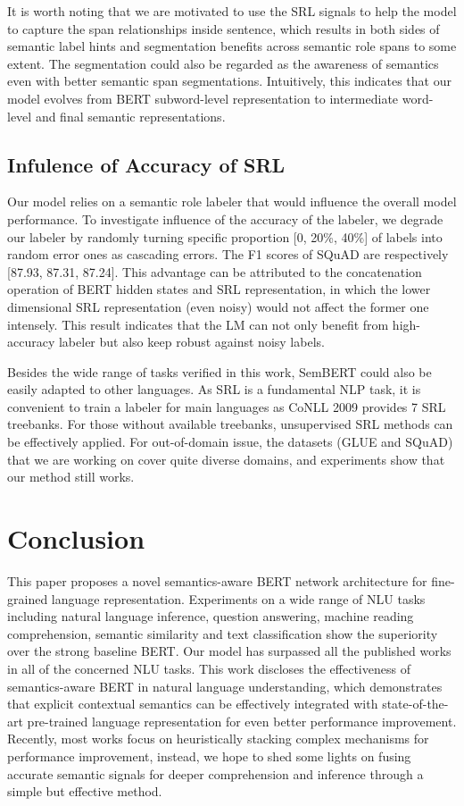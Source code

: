 \documentclass[letterpaper]{article} \usepackage{aaai20}  \usepackage{times}  \usepackage{helvet} \usepackage{courier}  \usepackage[hyphens]{url}  \usepackage{graphicx} \urlstyle{rm} \def\UrlFont{\rm}  \usepackage{graphicx}  \frenchspacing  \usepackage{amssymb}
\begin{document}
It is worth noting that we are motivated to use the SRL signals to help the model to capture the span relationships inside sentence, which results in both sides of semantic label hints and segmentation benefits across semantic role spans to some extent. The segmentation could also be regarded as the awareness of semantics even with better semantic span segmentations. Intuitively, this indicates that our model evolves from BERT subword-level representation to intermediate word-level and final semantic representations.

\subsection{Infulence of Accuracy of SRL}
Our model relies on a semantic role labeler that would influence the overall model performance. To investigate influence of the accuracy of the labeler, we degrade our labeler by randomly turning specific proportion [0, 20\%, 40\%] of labels into random error ones as cascading errors. The F1 scores of SQuAD are respectively [87.93, 87.31, 87.24]. This advantage can be attributed to the concatenation operation of BERT hidden states and SRL representation, in which the lower dimensional SRL representation (even noisy)  would not affect the former one intensely. This result indicates that the LM can not only benefit from high-accuracy labeler but also keep robust against noisy labels.

Besides the wide range of tasks verified in this work, SemBERT could also be easily adapted to other languages. As SRL is a fundamental NLP task, it is convenient to train a labeler for main languages as CoNLL 2009 provides 7 SRL treebanks. For those without available treebanks, unsupervised SRL methods can be effectively applied. For out-of-domain issue, the datasets (GLUE and SQuAD) that we are working on cover quite diverse domains, and experiments show that our method still works.

\section{Conclusion}\label{sec:concl}
This paper proposes a novel semantics-aware BERT network architecture for fine-grained language representation. Experiments on a wide range of NLU tasks including natural language inference, question answering, machine reading comprehension, semantic similarity and text classification show the superiority over the strong baseline BERT. Our model has surpassed all the published works in all of the concerned NLU tasks. This work discloses the effectiveness of semantics-aware BERT in natural language understanding, which demonstrates that explicit contextual semantics can be effectively integrated with state-of-the-art pre-trained language representation for even better performance improvement. Recently, most works focus on heuristically stacking complex mechanisms for performance improvement, instead, we hope to shed some lights on fusing accurate semantic signals for deeper comprehension and inference through a simple but effective method. 



\end{document}
